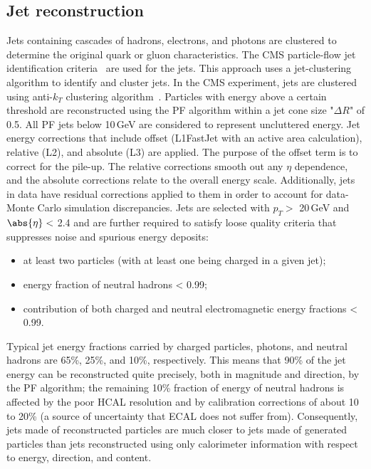 \subsection{Jet reconstruction}
Jets containing cascades of hadrons, electrons, and photons are clustered to determine the original quark or gluon characteristics. The CMS particle-flow jet identification criteria~\cite{CMS-PAS-PFT-10-002} are used for the jets. This approach uses a jet-clustering algorithm to identify and cluster jets. In the CMS experiment, jets are clustered using anti-$k_T$ clustering algorithm~\cite{Cacciari:2008gp}. Particles with energy above a certain threshold are reconstructed using the PF algorithm within a jet cone size "$\Delta R$" of 0.5. All PF jets below 10\,GeV are considered to represent uncluttered energy. Jet energy corrections that include offset (L1FastJet with an active area calculation), relative (L2), and absolute (L3) are applied. The purpose of the offset term is to correct for the pile-up. The relative corrections smooth out any $\eta$ dependence, and the absolute corrections relate to the overall energy scale. Additionally, jets in data have residual corrections applied to them in order to account for data-Monte Carlo simulation discrepancies. Jets are selected with $p_T >$ 20\,GeV and $\abs{\eta} <$ 2.4 and are further required to satisfy loose quality criteria that suppresses noise and spurious energy deposits:
\begin{itemize}
\item {at least two particles (with at least one being charged in a given jet);}
\item {energy fraction of neutral hadrons < 0.99;}
\item {contribution of both charged and neutral electromagnetic energy fractions < 0.99.}
\end{itemize}
Typical jet energy fractions carried by charged particles, photons, and neutral hadrons are 65\%, 25\%, and 10\%, respectively. This means that 90\% of the jet energy can be reconstructed quite precisely, both in magnitude and direction, by the PF algorithm; the remaining 10\% fraction of energy of neutral hadrons is affected by the poor HCAL resolution and by calibration corrections of about 10 to 20\% (a source of uncertainty that ECAL does not suffer from). Consequently, jets made of reconstructed particles are much closer to jets made of generated particles than jets reconstructed using only calorimeter information with respect to energy, direction, and content.
